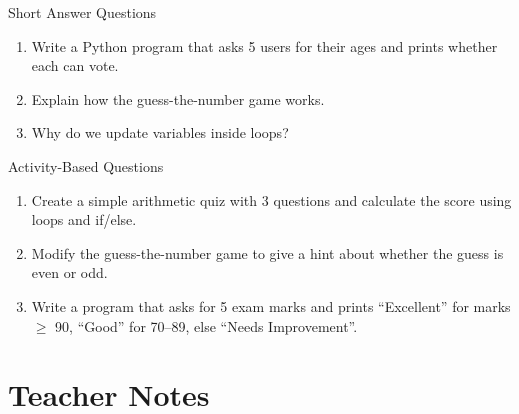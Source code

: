 \begin{exercise}{Short Answer Questions}
\begin{enumerate}
    \item Write a Python program that asks 5 users for their ages and prints whether each can vote.  
    \item Explain how the guess-the-number game works.  
    \item Why do we update variables inside loops?  
\end{enumerate}
\end{exercise}

\begin{exercise}{Activity-Based Questions}
\begin{enumerate}
    \item Create a simple arithmetic quiz with 3 questions and calculate the score using loops and if/else.  
    \item Modify the guess-the-number game to give a hint about whether the guess is even or odd.  
    \item Write a program that asks for 5 exam marks and prints “Excellent” for marks $\ge$ 90, “Good” for 70–89, else “Needs Improvement”.  
\end{enumerate}
\end{exercise}

\section{Teacher Notes}

